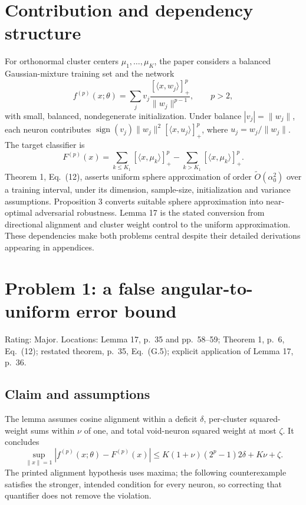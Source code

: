 \documentclass[10pt]{article}
\begin{document}
\section*{Contribution and dependency structure}
For orthonormal cluster centers \(\mu_1,\ldots,\mu_K\), the paper considers a balanced Gaussian-mixture training set and the network \[f^{(p)}(x;\theta)=\sum_j v_j
 \frac{[\langle x,w_j\rangle]_+^p}{\|w_j\|^{p-1}},\qquad p>2,\] with small, balanced, nondegenerate initialization. Under balance \(|v_j|=\|w_j\|\), each neuron contributes \(\operatorname{sign}(v_j)\|w_j\|^2[\langle x,u_j\rangle]_+^p\), where \(u_j=w_j/\|w_j\|\). The target classifier is \[F^{(p)}(x)=\sum_{k\le K_1}[\langle x,\mu_k\rangle]_+^p
 -\sum_{k>K_1}[\langle x,\mu_k\rangle]_+^p.\] Theorem 1, Eq. (12), asserts uniform sphere approximation of order \(\widetilde O(\alpha_0^2)\) over a training interval, under its dimension, sample-size, initialization and variance assumptions. Proposition 3 converts suitable sphere approximation into near-optimal adversarial robustness. Lemma 17 is the stated conversion from directional alignment and cluster weight control to the uniform approximation. These dependencies make both problems central despite their detailed derivations appearing in appendices.\par
\section*{Problem 1: a false angular-to-uniform error bound}
Rating: Major. Locations: Lemma 17, p. 35 and pp. 58–59; Theorem 1, p. 6, Eq. (12); restated theorem, p. 35, Eq. (G.5); explicit application of Lemma 17, p. 36.\par
\subsection*{Claim and assumptions}
The lemma assumes cosine alignment within a deficit \(\delta\), per-cluster squared-weight sums within \(\nu\) of one, and total void-neuron squared weight at most \(\zeta\). It concludes \[\sup_{\|x\|=1}|f^{(p)}(x;\theta)-F^{(p)}(x)|
 \le K(1+\nu)(2^p-1)2\delta+K\nu+\zeta. \tag{R1}\] The printed alignment hypothesis uses maxima; the following counterexample satisfies the stronger, intended condition for every neuron, so correcting that quantifier does not remove the violation.\par
\end{document}
